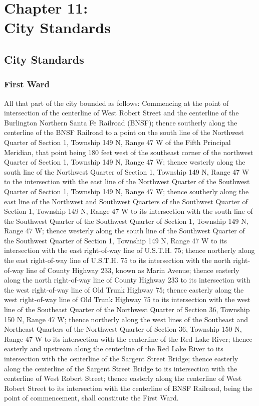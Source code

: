 \chapter*{Chapter 11: \\
	City Standards}
    \minitoc
    
\section{City Standards}
\subsection{First Ward}
All that part of the city bounded as follows:  Commencing at the point of intersection of the centerline of West Robert Street and the centerline of the Burlington Northern Santa Fe Railroad (BNSF); thence southerly along the centerline of the BNSF Railroad to a point on the south line of the Northwest Quarter of Section 1, Township 149 N, Range 47 W of the Fifth Principal Meridian, that point being 180 feet west of the southeast corner of the northwest Quarter of Section 1, Township 149 N, Range 47 W; thence westerly along the south line of the Northwest Quarter of Section 1, Township 149 N, Range 47 W to the intersection with the east line of the Northwest Quarter of the Southwest Quarter of Section 1, Township 149 N, Range 47 W; thence southerly along the east line of the Northwest and Southwest Quarters of the Southwest Quarter of Section 1, Township 149 N, Range 47 W to its intersection with the south line of the Southwest Quarter of the Southwest Quarter of Section 1, Township 149 N, Range 47 W; thence westerly along the south line of the Southwest Quarter of the Southwest Quarter of Section 1, Township 149 N, Range 47 W to its intersection with the east right-of-way line of U.S.T.H. 75; thence northerly along the east right-of-way line of U.S.T.H. 75 to its intersection with the north right-of-way line of County Highway 233, known as Marin Avenue; thence easterly along the north right-of-way line of County Highway 233 to its intersection with the west right-of-way line of Old Trunk Highway 75; thence easterly along the west right-of-way line of Old Trunk Highway 75 to its intersection with the west line of the Southeast Quarter of the Northwest Quarter of Section 36, Township 150 N, Range 47 W; thence northerly along the west lines of the Southeast and Northeast Quarters of the Northwest Quarter of Section 36, Township 150 N, Range 47 W to its intersection with the centerline of the Red Lake River; thence easterly and upstream along the centerline of the Red Lake River to its intersection with the centerline of the Sargent Street Bridge; thence easterly along the centerline of the Sargent Street Bridge to its intersection with the centerline of West Robert Street; thence easterly along the centerline of West Robert Street to its intersection with the centerline of BNSF Railroad, being the point of commencement, shall constitute the First Ward.

